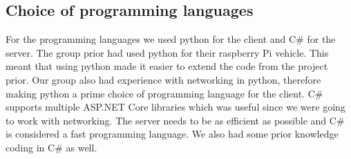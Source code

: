 \subsection{Choice of programming languages}
For the programming languages we used python for the client and C\# for the server. The group prior had used python for their raspberry Pi vehicle. This meant that using python made it easier to extend the code from the project prior. Our group also had experience with networking in python, therefore making python a prime choice of programming language for the client. C\# supports multiple ASP.NET Core libraries which was useful since we were going to work with networking. The server needs to be as efficient as possible and C\# is considered a fast programming language. We also had some prior knowledge coding in C\# as well.